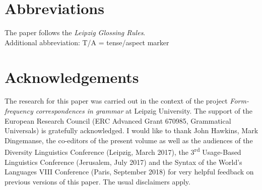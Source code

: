 \documentclass[output=paper]{langsci/langscibook}
\begin{document}
\section*{Abbreviations}

The paper follows the \textit{Leipzig Glossing Rules}.\\ Additional abbreviation: T/A = tense/aspect marker

\section*{Acknowledgements}

The research for this paper was carried out in the context of the project \textit{Form-frequency correspondences in grammar} at Leipzig University. The support of the European Research Council (ERC Advanced Grant 670985, Grammatical Universals) is gratefully acknowledged. I would like to thank John Hawkins, Mark Dingemanse, the co-editors of the present volume as well as the audiences of the Diversity Linguistics Conference (Leipzig,  {March 2017}), the 3\textsuperscript{rd} Usage-Based Linguistics Conference (Jerusalem,  {July 2017}) and the Syntax of the World’s Languages VIII Conference (Paris,  {September 2018}) for very helpful feedback on previous versions of this paper. The usual disclaimers apply.

\sloppy
\printbibliography[heading=references]
\end{document}
